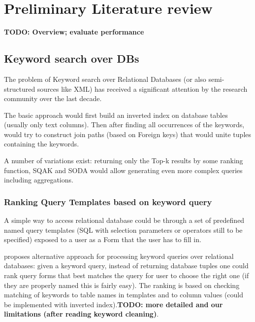 \documentclass[a4paper,11pt,draft]{article}
\begin{document}
\section{Preliminary Literature review}


\textbf{\color{red}TODO: Overview; evaluate performance}


\subsection{Keyword search over DBs}
The problem of Keyword search over Relational Databases (or also semi-structured sources like XML) has received a significant attention by the research community over the last decade. 

The basic approach would first build an inverted index on database tables (usually only text columns). Then after finding all occurrences of the keywords, would try to construct join paths (based on Foreign keys) that would unite tuples containing the keywords.

% 
A number of variations exist:  returning only the Top-k results by some ranking function, SQAK and SODA would allow generating even more complex queries including aggregations.



\subsubsection*{Ranking Query Templates based on keyword query}
A simple way to access relational database could  be through a set of predefined named query templates (SQL with selection parameters or operators still to be specified) exposed to a user as a Form that the user has to fill in.

\cite{forms_kws} proposes alternative approach for processing keyword queries over relational databases: given a keyword query, instead of returning database tuples one could rank query forms that best matches the query for user to choose the right one (if they are properly named this is fairly easy). The ranking is based on checking matching of keywords to table names in templates and to column values (could be implemented with inverted index).\textbf{\color{red}TODO: more detailed and our limitations (after reading keyword cleaning)}.
\end{document}
